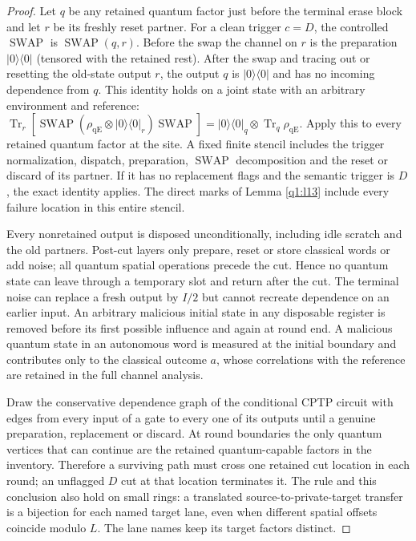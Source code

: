 \begin{proof}
Let \(q\) be any retained quantum factor just before the terminal erase block and let \(r\) be its freshly reset partner. For a clean trigger \(c=D\), the controlled \(\operatorname{SWAP}\) is \(\operatorname{SWAP}(q,r)\). Before the swap the channel on \(r\) is the preparation \(\lvert 0\rangle\langle 0\rvert\) (tensored with the retained rest). After the swap and tracing out or resetting the old-state output \(r\), the output \(q\) is \(\lvert 0\rangle\langle 0\rvert\) and has no incoming dependence from \(q\). This identity holds on a joint state with an arbitrary environment and reference: \(\operatorname{Tr}_{r}[\operatorname{SWAP}(\rho_{\mathrm{qE}} \otimes  \lvert 0\rangle\langle 0\rvert_{r})\operatorname{SWAP}]=\lvert 0\rangle\langle 0\rvert_{q} \otimes \operatorname{Tr}_{q} \rho_{\mathrm{qE}}\). Apply this to every retained quantum factor at the site. A fixed finite stencil includes the trigger normalization, dispatch, preparation, \(\operatorname{SWAP}\) decomposition and the reset or discard of its partner. If it has no replacement flags and the semantic trigger is \(D\), the exact identity applies. The direct marks of Lemma \ref{q1:l13} include every failure location in this entire stencil.

Every nonretained output is disposed unconditionally, including idle scratch and the old partners. Post-cut layers only prepare, reset or store classical words or add noise; all quantum spatial operations precede the cut. Hence no quantum state can leave through a temporary slot and return after the cut. The terminal noise can replace a fresh output by \(I/2\) but cannot recreate dependence on an earlier input. An arbitrary malicious initial state in any disposable register is removed before its first possible influence and again at round end. A malicious quantum state in an autonomous word is measured at the initial boundary and contributes only to the classical outcome \(a\), whose correlations with the reference are retained in the full channel analysis.

Draw the conservative dependence graph of the conditional CPTP circuit with edges from every input of a gate to every one of its outputs until a genuine preparation, replacement or discard. At round boundaries the only quantum vertices that can continue are the retained quantum-capable factors in the inventory. Therefore a surviving path must cross one retained cut location in each round; an unflagged \(D\) cut at that location terminates it. The rule and this conclusion also hold on small rings: a translated source-to-private-target transfer is a bijection for each named target lane, even when different spatial offsets coincide modulo \(L\). The lane names keep its target factors distinct. 
\end{proof}

